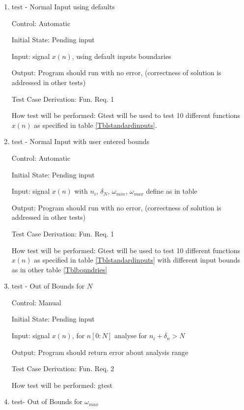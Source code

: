 \documentclass[12pt, titlepage]{article}
\begin{document}
\begin{enumerate}

\item{test - Normal Input using defaults\\}

Control: Automatic
					
Initial State: Pending input
					
Input: signal $x(n)$, using default inputs boundaries 
					
Output: Program should run with no error, (correctness of solution is addressed in other tests)

Test Case Derivation: Fun. Req. 1
					
How test will be performed: Gtest will be used to test 10 different functions $x(n)$ as specified in table \ref{Tblstandardinputs}.

\item{test - Normal Input with user entered bounds\\}

Control: Automatic
					
Initial State: Pending input
					
Input: signal $x(n)$ with $n_i$, $\delta_N$, $\omega_{min} $, $\omega_{max}$ define as in table 
					
Output: Program should run with no error, (correctness of solution is addressed in other tests)

Test Case Derivation: Fun. Req. 1
					
How test will be performed: Gtest will be used to test 10 different functions $x(n)$ as specified in table \ref{Tblstandardinputs} with different input bounds as in other table \ref{Tblboundries}

\item{test - Out of Bounds for $N$\\}

Control: Manual
					
Initial State: Pending input
					
Input: signal $x(n)$, for $n[0:N]$ analyse for $n_i + \delta_n > N$
					
Output: Program should return error about analysis range

Test Case Derivation: Fun. Req. 2
					
How test will be performed: gtest 
					
\item{test- Out of Bounds for $\omega_{max}$\\}


\end{enumerate}
\end{document}
